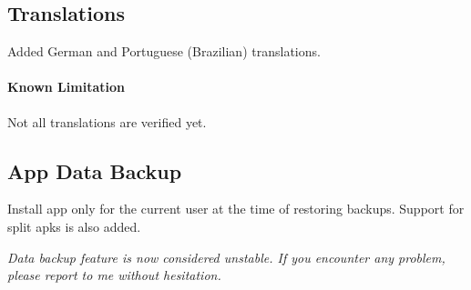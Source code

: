 \subsection{Translations}
Added German and Portuguese (Brazilian) translations.

\paragraph{Known Limitation} Not all translations are verified yet.

\subsection{App Data Backup}
Install app only for the current user at the time of restoring backups. Support for split apks is also added.

\textit{Data backup feature is now considered unstable. If you encounter any problem, please report to me without hesitation.}
